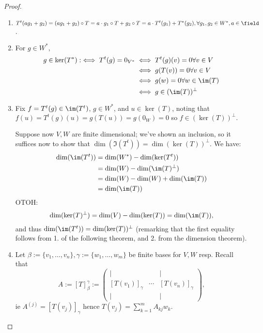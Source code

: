 \begin{proof}
    \begin{enumerate}
        \item $T^t(ag_1 + g_2) = (ag_1 + g_2)\circ T = a \cdot g_1 \circ T + g_2 \circ T = a \cdot T^{t}(g_1) + T^\ast(g_2), \forall g_1, g_2 \in W^\ast, a \in \field$.
        \item For $g \in W^\ast$, \begin{align*}
            g \in \ker(T^\ast) :\iff T^t(g) = 0_{V^\ast} &\iff T^t(g)(v) = 0 \forall v \in V\\
            &\iff g(T(v)) = 0 \forall v \in V\\
            &\iff g(w) = 0 \forall w \in \im(T)\\
            &\iff g \in (\im(T))^\perp
        \end{align*}
        \item Fix $f = T^t(g) \in \im(T^t)$, $g \in W^\ast$, and $u \in \ker(T)$, noting that $f(u) = T^t(g)(u) = g(T(u)) = g(0_W) = 0$ so $f \in (\ker(T))^\perp$.
        
        Suppose now $V, W$ are finite dimensional; we've shown an inclusion, so it suffices now to show that $\dim(\Im(T^t)) = \dim(\ker(T))^\perp$. We have:
        \begin{align*}
            \dim(\im(T^t)) &= \dim(W^\ast) - \dim(\ker(T^t)) \\
            &= \dim(W) - \dim(\im(T)^\perp) \\
            &= \dim(W) - \dim(W) + \dim(\im(T))\\ 
            &= \dim(\im(T))
        \end{align*}
        OTOH:
        \begin{align*}
            \dim(\ker(T)^\perp) = \dim(V) - \dim(\ker(T)) = \dim(\im(T)),
        \end{align*}
        and thus $\dim(\im(T^t)) = \dim(\ker(T))^\perp$ (remarking that the first equality follows from 1. of the following theorem, and 2. from the dimension theorem).

        \item Let $\beta :=\{v_1, \dots, v_n\}, \gamma := \{w_1, \dots, w_m\}$ be finite bases for $V, W$ resp. Recall that $$A := [T]_\beta^\gamma := \begin{pmatrix}
            \vert & & \vert\\
            [T(v_1)]_\gamma & \cdots & [T(v_n)]_\gamma\\
            \vert & & \vert
        \end{pmatrix},$$
        ie $A^{(j)} = [T(v_j)]_\gamma$ hence $T(v_j) = \sum_{k=1}^m A_{kj} w_k$.


\end{enumerate}
\end{proof}
